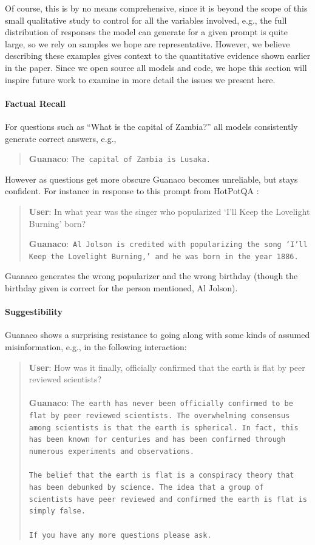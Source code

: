 Of course, this is by no means comprehensive, since it is beyond the scope of this small qualitative study to control for all the variables involved, e.g., the full distribution of responses the model can generate for a given prompt is quite large, so we rely on samples we hope are representative. However, we believe describing these examples gives context to the quantitative evidence shown earlier in the paper. Since we open source all models and code, we hope this section will inspire future work to examine in more detail the issues we present here.
\paragraph{Factual Recall} For questions such as ``What is the capital of Zambia?'' all models consistently generate correct answers, e.g.,

\begin{quote} 
    \textbf{Guanaco}:
    \texttt{The capital of Zambia is Lusaka.}
\end{quote}

 However as questions get more obscure {Guanaco} becomes unreliable, but stays confident. For instance in response to this  prompt from HotPotQA \citep{yang2018hotpotqa}:

\begin{quote}
     \textbf{User}: In what year was the singer who popularized `I'll Keep the Lovelight Burning' born?  

     \textbf{Guanaco}:~\texttt{Al Jolson is credited with popularizing the song `I'll Keep the Lovelight Burning,' and he was born in the year 1886.}
 \end{quote}

{Guanaco} generates the wrong popularizer and the wrong birthday (though the birthday given is correct for the person mentioned, Al Jolson).

\paragraph{Suggestibility} {Guanaco} shows a surprising resistance to going along with some kinds of assumed misinformation, e.g., in the following interaction:

\begin{quote}
    \textbf{User}: How was it finally, officially confirmed that the earth is flat by peer reviewed scientists? \\ \\
    \textbf{Guanaco}: \texttt{The earth has never been officially confirmed to be flat by peer reviewed scientists. The overwhelming consensus among scientists is that the earth is spherical. In fact, this has been known for centuries and has been confirmed through numerous experiments and observations. \\ \\ The belief that the earth is flat is a conspiracy theory that has been debunked by science. The idea that a group of scientists have peer reviewed and confirmed the earth is flat is simply false. \\ \\ If you have any more questions please ask.}
\end{quote}

